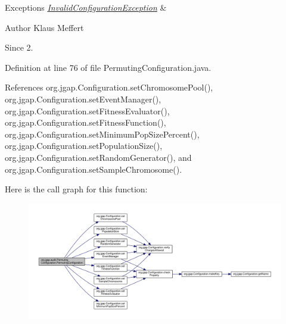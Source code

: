 \begin{DoxyExceptions}{Exceptions}
{\em \hyperlink{classorg_1_1jgap_1_1_invalid_configuration_exception}{Invalid\-Configuration\-Exception}} & \\
\hline
\end{DoxyExceptions}
\begin{DoxyAuthor}{Author}
Klaus Meffert 
\end{DoxyAuthor}
\begin{DoxySince}{Since}
2. 
\end{DoxySince}


Definition at line 76 of file Permuting\-Configuration.\-java.



References org.\-jgap.\-Configuration.\-set\-Chromosome\-Pool(), org.\-jgap.\-Configuration.\-set\-Event\-Manager(), org.\-jgap.\-Configuration.\-set\-Fitness\-Evaluator(), org.\-jgap.\-Configuration.\-set\-Fitness\-Function(), org.\-jgap.\-Configuration.\-set\-Minimum\-Pop\-Size\-Percent(), org.\-jgap.\-Configuration.\-set\-Population\-Size(), org.\-jgap.\-Configuration.\-set\-Random\-Generator(), and org.\-jgap.\-Configuration.\-set\-Sample\-Chromosome().



Here is the call graph for this function\-:
\nopagebreak
\begin{figure}[H]
\begin{center}
\leavevmode
\includegraphics[width=350pt]{classorg_1_1jgap_1_1audit_1_1_permuting_configuration_a2ccb4dcfcc9af01b645be257e4dc5d38_cgraph}
\end{center}
\end{figure}




